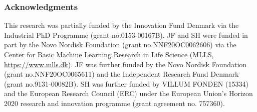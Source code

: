 {\subsubsection*{Acknowledgments}
This research was partially funded by the Innovation Fund Denmark via the Industrial PhD Programme (grant no.\@ 0153-00167B). JF and SH were funded in part by the Novo Nordisk Foundation (grant no.\@ NNF20OC0062606) via the Center for Basic Machine Learning Research in Life Science (MLLS, \hyperlink{https://www.mlls.dk}{https://www.mlls.dk}). JF was further funded by the Novo Nordisk Foundation (grant no.\@ NNF20OC0065611) and the Independent Research Fund Denmark (grant no.\@ 9131-00082B). SH was further funded by VILLUM FONDEN (15334) and the European Research Council (ERC) under the European Union’s Horizon 2020 research and innovation programme (grant agreement no. 757360).

}
